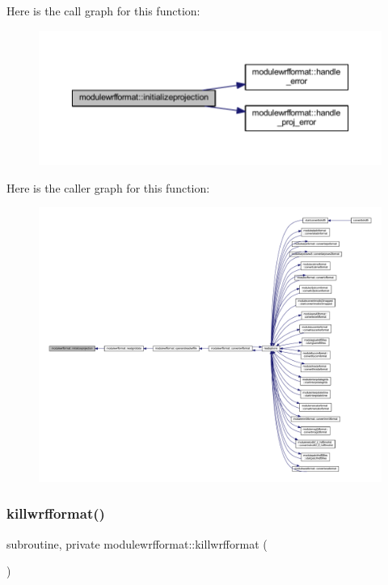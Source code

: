 Here is the call graph for this function\+:\nopagebreak
\begin{figure}[H]
\begin{center}
\leavevmode
\includegraphics[width=350pt]{namespacemodulewrfformat_a4a00c0e3d836f215b0275950c3cc307c_cgraph}
\end{center}
\end{figure}
Here is the caller graph for this function\+:\nopagebreak
\begin{figure}[H]
\begin{center}
\leavevmode
\includegraphics[width=350pt]{namespacemodulewrfformat_a4a00c0e3d836f215b0275950c3cc307c_icgraph}
\end{center}
\end{figure}
\mbox{\label{namespacemodulewrfformat_a5b240148e53caa6048e5a298bb4b0376}} 
\subsubsection{\texorpdfstring{killwrfformat()}{killwrfformat()}}
{\footnotesize\ttfamily subroutine, private modulewrfformat\+::killwrfformat (\begin{DoxyParamCaption}{ }\end{DoxyParamCaption})\hspace{0.3cm}{\ttfamily [private]}}

